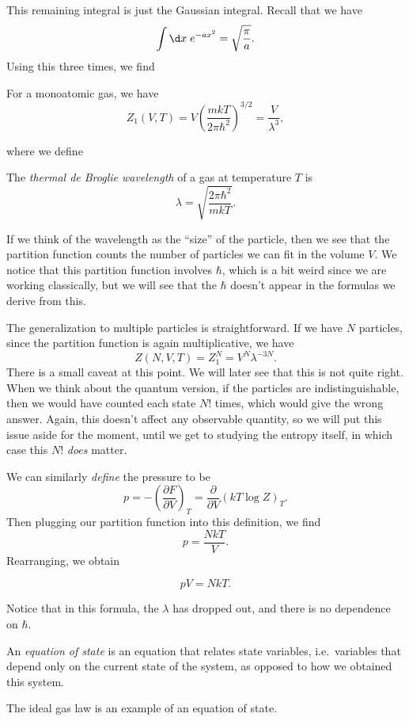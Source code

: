 \documentclass[a4paper]{article}
\begin{document}
This remaining integral is just the Gaussian integral. Recall that we have
\[
  \int \d x\; e^{-a x^2} = \sqrt{\frac{\pi}{a}}.
\]
Using this three times, we find
\begin{prop}
  For a monoatomic gas, we have
  \[
    Z_1(V, T) = V\left(\frac{mkT}{2\pi \hbar^2}\right)^{3/2} = \frac{V}{\lambda^3},
  \]
\end{prop}
where we define
\begin{defi}\index{$\lambda$}
  The \emph{thermal de Broglie wavelength} of a gas at temperature $T$ is
  \[
    \lambda = \sqrt{\frac{2\pi \hbar^2}{mkT}}.
  \]
\end{defi}
If we think of the wavelength as the ``size'' of the particle, then we see that the partition function counts the number of particles we can fit in the volume $V$. We notice that this partition function involves $\hbar$, which is a bit weird since we are working classically, but we will see that the $\hbar$ doesn't appear in the formulas we derive from this.

The generalization to multiple particles is straightforward. If we have $N$ particles, since the partition function is again multiplicative, we have
\[
  Z(N, V, T) = Z_1^N = V^N \lambda^{-3N}.
\]
There is a small caveat at this point. We will later see that this is not quite right. When we think about the quantum version, if the particles are indistinguishable, then we would have counted each state $N!$ times, which would give the wrong answer. Again, this doesn't affect any observable quantity, so we will put this issue aside for the moment, until we get to studying the entropy itself, in which case this $N!$ \emph{does} matter.

We can similarly \emph{define} the pressure to be
\[
  p = - \left(\frac{\partial F}{\partial V}\right)_T = \frac{\partial}{\partial V} (k T \log Z)_T.
\]
Then plugging our partition function into this definition, we find
\[
  p = \frac{NkT}{V}.
\]
Rearranging, we obtain
\begin{prop}
  \[
    pV = NkT.
  \]
\end{prop}
Notice that in this formula, the $\lambda$ has dropped out, and there is no dependence on $\hbar$.

\begin{defi}
  An \emph{equation of state} is an equation that relates state variables, i.e.\ variables that depend only on the current state of the system, as opposed to how we obtained this system.
\end{defi}
The ideal gas law is an example of an equation of state.
\end{document}

